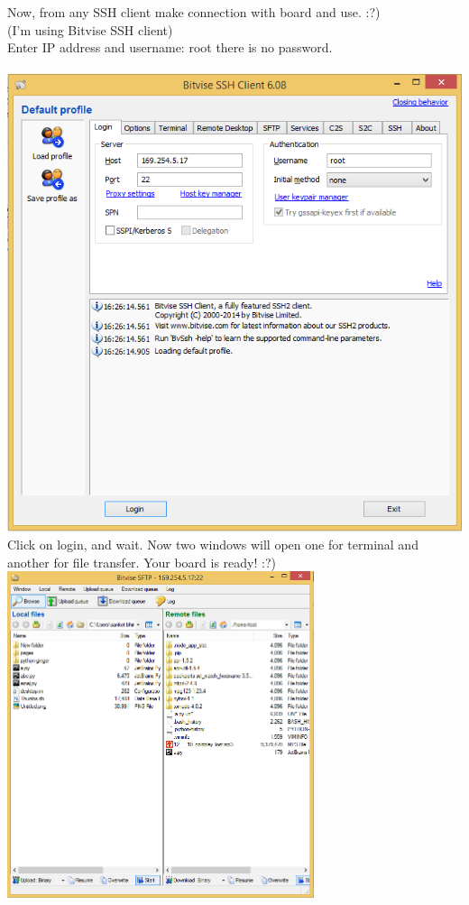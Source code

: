 \documentclass[11pt,a4paper]{article}
\begin{document}
	Now, from any SSH client make connection with board and use. :?)\\
(I’m using Bitvise SSH client)\\
Enter IP address and username: root there is no password.\\
\vspace{.3cm}\\
\includegraphics[width=\linewidth]{4.png}
\vspace{.3cm}\\
Click on login, and wait. Now two windows will open one for terminal and another for file transfer.
Your board is ready! :?)
  \vspace{.3cm}\\
\includegraphics[width=9cm]{5.png}
\end{document}
